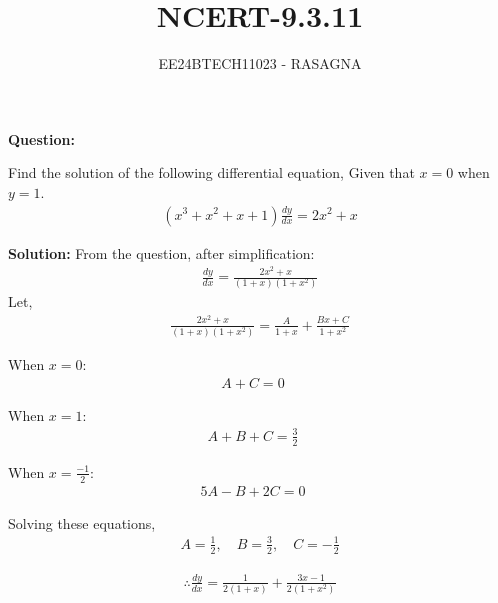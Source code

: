 \documentclass[journal]{IEEEtran}
\begin{document}

\vspace{3cm}

\title{NCERT-9.3.11}
\author{EE24BTECH11023 - RASAGNA}

{\let\newpage\relax\maketitle}

\renewcommand{\thefigure}{\theenumi}
\renewcommand{\thetable}{\theenumi}
\setlength{\intextsep}{10pt} %


\renewcommand{\thetable}{\theenumi}
\textbf{Question:}

Find the solution of the following differential equation, Given that $x = 0$ when $y = 1$.
\begin{align*}
    (x^3 + x^2 + x + 1) \frac{dy}{dx} = 2x^2 + x
\end{align*}

\textbf{Solution:}
From the question, after simplification:
\begin{align}
    \frac{dy}{dx}= \frac{2x^2 + x}{(1+x)(1+x^2)}
\end{align}
Let,
\begin{align}
\frac{2x^2 + x}{(1+x)(1+x^2)} = \frac{A}{1+x} + \frac{Bx+C}{1+x^2}
\end{align}

When $x = 0$:
\begin{align}
A + C = 0 \quad 
\end{align}

When $x = 1$:
\begin{align}
A + B + C = \frac{3}{2} \quad 
\end{align}

When $x = \frac{-1}{2}$:
\begin{align}
5A -B + 2C = 0 \quad 
\end{align}

Solving these equations,
\begin{align}
A = \frac{1}{2}, \quad B = \frac{3}{2}, \quad C = -\frac{1}{2}
\end{align}

\begin{align}
    \therefore \frac{dy}{dx} = \frac{1}{2(1+x)} + \frac{3x-1}{2(1+x^2)}
\end{align}
\end{document}
